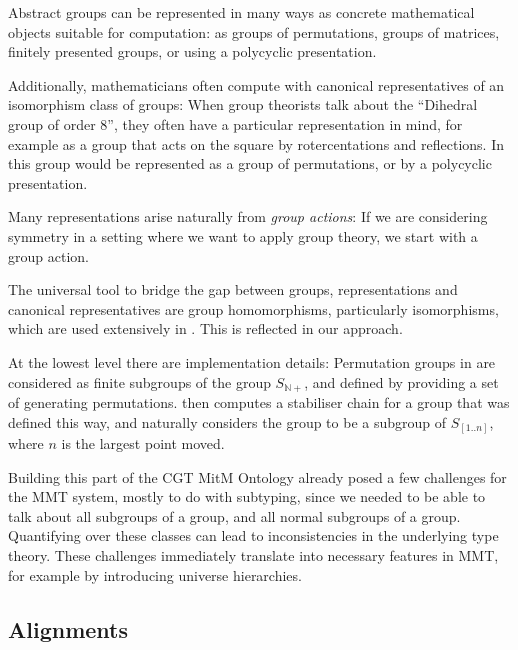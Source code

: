 \smallskip

Abstract groups can be represented in many ways as concrete mathematical
objects suitable for computation: as groups of permutations, groups of matrices,
finitely presented groups, or using a polycyclic presentation.

Additionally, mathematicians often compute with canonical representatives of an
isomorphism class of groups: When group theorists talk about the ``Dihedral
group of order 8'', they often have a particular representation in
mind, for example as a group that acts on the square by rotercentations
and reflections. In \GAP this group would be represented as a group of
permutations, or by a polycyclic presentation.

Many representations arise naturally from \emph{group actions}: If we are
considering symmetry in a setting where we want to apply group theory, we start
with a group action.

The universal tool to bridge the gap between groups, representations and
canonical representatives are group homomorphisms, particularly isomorphisms,
which are used extensively in \GAP. This is reflected in our approach.

\smallskip

At the lowest level there are implementation details: Permutation groups in \GAP
are considered as finite subgroups of the group $S_{\mathbb{N}+}$, and defined by
providing a set of generating permutations. \GAP then computes a stabiliser chain
for a group that was defined this way, and naturally considers the group to be a
subgroup of $S_{[1..n]}$, where $n$ is the largest point moved.

\smallskip

Building this part of the CGT MitM Ontology already posed a few challenges for
the MMT system, mostly to do with subtyping, since we needed to be able to talk
about all subgroups of a group, and all normal subgroups of a group. Quantifying
over these classes can lead to inconsistencies in the underlying type theory.
These challenges immediately translate into necessary
features in MMT, for example by introducing universe hierarchies.

\subsection{Alignments}

